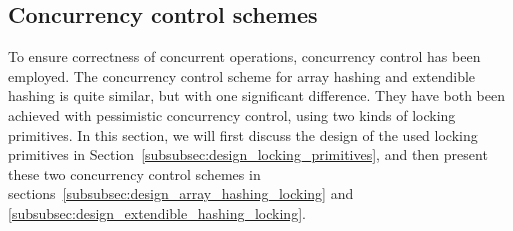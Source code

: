 \documentclass[11pt]{article} %
\begin{document}
\subsection{Concurrency control schemes}
\label{subsec:design_concurrency_control_scheme}
To ensure correctness of concurrent operations, concurrency control has been employed. The concurrency control scheme for array hashing and extendible hashing is quite similar, but with one significant difference. They have both been achieved with pessimistic concurrency control, using two kinds of locking primitives. In this section, we will first discuss the design of the used locking primitives in Section~\ref{subsubsec:design_locking_primitives}, and then present these two concurrency control schemes in sections~\ref{subsubsec:design_array_hashing_locking} and \ref{subsubsec:design_extendible_hashing_locking}.
\end{document}
